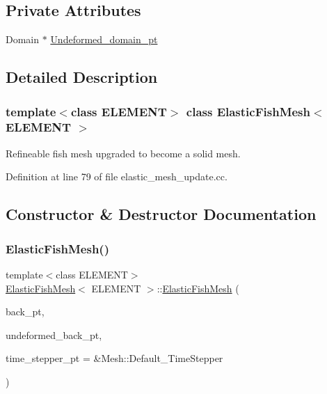\subsection*{Private Attributes}
\begin{DoxyCompactItemize}
\item 
Domain $\ast$ \hyperlink{classElasticFishMesh_acc86ce0248b350ee3e24142f393f2b08}{Undeformed\+\_\+domain\+\_\+pt}
\end{DoxyCompactItemize}


\subsection{Detailed Description}
\subsubsection*{template$<$class E\+L\+E\+M\+E\+NT$>$\newline
class Elastic\+Fish\+Mesh$<$ E\+L\+E\+M\+E\+N\+T $>$}

Refineable fish mesh upgraded to become a solid mesh. 

Definition at line 79 of file elastic\+\_\+mesh\+\_\+update.\+cc.



\subsection{Constructor \& Destructor Documentation}
\mbox{\label{classElasticFishMesh_a76c4d63d48b9ee48c3742e55057cfba0}} 
\subsubsection{\texorpdfstring{Elastic\+Fish\+Mesh()}{ElasticFishMesh()}\hspace{0.1cm}{\footnotesize\ttfamily [1/2]}}
{\footnotesize\ttfamily template$<$class E\+L\+E\+M\+E\+NT$>$ \\
\hyperlink{classElasticFishMesh}{Elastic\+Fish\+Mesh}$<$ E\+L\+E\+M\+E\+NT $>$\+::\hyperlink{classElasticFishMesh}{Elastic\+Fish\+Mesh} (\begin{DoxyParamCaption}\item[{Geom\+Object $\ast$}]{back\+\_\+pt,  }\item[{Geom\+Object $\ast$}]{undeformed\+\_\+back\+\_\+pt,  }\item[{Time\+Stepper $\ast$}]{time\+\_\+stepper\+\_\+pt = {\ttfamily \&Mesh\+:\+:Default\+\_\+TimeStepper} }\end{DoxyParamCaption})\hspace{0.3cm}{\ttfamily [inline]}}



